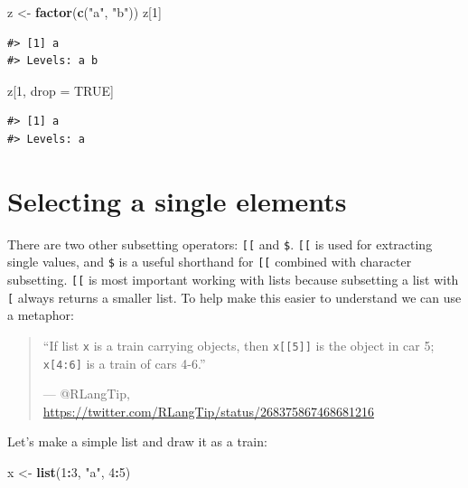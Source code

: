 \documentclass[]{book}
\newenvironment{Shaded}{\begin{snugshade}}{\end{snugshade}}
\newcommand{\KeywordTok}[1]{\textcolor[rgb]{0.13,0.29,0.53}{\textbf{#1}}}
\newcommand{\DecValTok}[1]{\textcolor[rgb]{0.00,0.00,0.81}{#1}}
\newcommand{\StringTok}[1]{\textcolor[rgb]{0.31,0.60,0.02}{#1}}
\newcommand{\OtherTok}[1]{\textcolor[rgb]{0.56,0.35,0.01}{#1}}
\newcommand{\OperatorTok}[1]{\textcolor[rgb]{0.81,0.36,0.00}{\textbf{#1}}}
\newcommand{\NormalTok}[1]{#1}
\theoremstyle{definition}
\theoremstyle{definition}
\theoremstyle{definition}
\theoremstyle{remark}
\begin{document}
\begin{Shaded}
\begin{Highlighting}[]
\NormalTok{z <-}\StringTok{ }\KeywordTok{factor}\NormalTok{(}\KeywordTok{c}\NormalTok{(}\StringTok{"a"}\NormalTok{, }\StringTok{"b"}\NormalTok{))}
\NormalTok{z[}\DecValTok{1}\NormalTok{]}
\end{Highlighting}
\end{Shaded}

\begin{verbatim}
#> [1] a
#> Levels: a b
\end{verbatim}

\begin{Shaded}
\begin{Highlighting}[]
\NormalTok{z[}\DecValTok{1}\NormalTok{, drop =}\StringTok{ }\OtherTok{TRUE}\NormalTok{]}
\end{Highlighting}
\end{Shaded}

\begin{verbatim}
#> [1] a
#> Levels: a
\end{verbatim}

\section{Selecting a single elements}\label{selecting-a-single-elements}

There are two other subsetting operators: \texttt{{[}{[}} and
\texttt{\$}. \texttt{{[}{[}} is used for extracting single values, and
\texttt{\$} is a useful shorthand for \texttt{{[}{[}} combined with
character subsetting. \texttt{{[}{[}} is most important working with
lists because subsetting a list with \texttt{{[}} always returns a
smaller list. To help make this easier to understand we can use a
metaphor:

\begin{quote}
``If list \texttt{x} is a train carrying objects, then
\texttt{x{[}{[}5{]}{]}} is the object in car 5; \texttt{x{[}4:6{]}} is a
train of cars 4-6.''

--- @RLangTip,
\url{https://twitter.com/RLangTip/status/268375867468681216}
\end{quote}

Let's make a simple list and draw it as a train:

\begin{Shaded}
\begin{Highlighting}[]
\NormalTok{x <-}\StringTok{ }\KeywordTok{list}\NormalTok{(}\DecValTok{1}\OperatorTok{:}\DecValTok{3}\NormalTok{, }\StringTok{"a"}\NormalTok{, }\DecValTok{4}\OperatorTok{:}\DecValTok{5}\NormalTok{)}
\end{Highlighting}
\end{Shaded}
\end{document}
